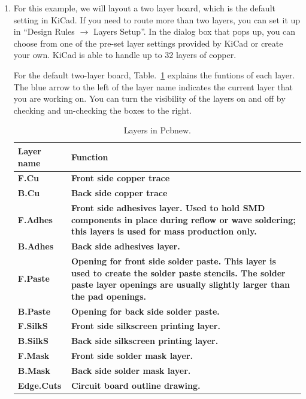 \documentclass[12pt,letterpaper]{scrartcl}
\begin{document}
\begin{enumerate}
	\item For this example, we will layout a two layer board, which is the default setting in KiCad. If you need to route more than two layers, you can set it up in ``Design Rules $\rightarrow$ Layers Setup''. In the dialog box that pops up, you can choose from one of the pre-set layer settings provided by KiCad or create your own. KiCad is able to handle up to 32 layers of copper. 

	For the default two-layer board, Table.~\ref{tab:pcb-layers} explains the funtions of each layer. The blue arrow to the left of the layer name indicates the current layer that you are working on. You can turn the visibility of the layers on and off by checking and un-checking the boxes to the right. 
			
		\begin{table}[hp]
			\centering
			\caption{Layers in Pcbnew.}
			\renewcommand{\arraystretch}{1.2}
			\small
			\begin{tabular}{|>{\centering\bfseries}m{1in}|>{\centering\bfseries\arraybackslash}m{4in}|}
				\hline
				Layer name & Function \\
				\hline
				\hline F.Cu & Front side copper trace\\
				\hline B.Cu & Back side copper trace \\
				\hline F.Adhes & Front side adhesives layer. Used to hold SMD components in place during reflow or wave soldering; this layers is used for mass production only. \\
				\hline B.Adhes & Back side adhesives layer.\\
				\hline F.Paste & Opening for front side solder paste. This layer is used to create the solder paste stencils. The solder paste layer openings are usually slightly larger than the pad openings.\\
				\hline B.Paste & Opening for back side solder paste.\\
				\hline F.SilkS & Front side silkscreen printing layer. \\
				\hline B.SilkS & Back side silkscreen printing layer. \\
				\hline F.Mask &	Front side solder mask layer. \\
				\hline B.Mask & Back side solder mask layer. \\
				\hline Edge.Cuts & Circuit board outline drawing.\\
				\hline 
			\end{tabular}
			\label{tab:pcb-layers}
		\end{table}
	

\end{enumerate}
\end{document}
